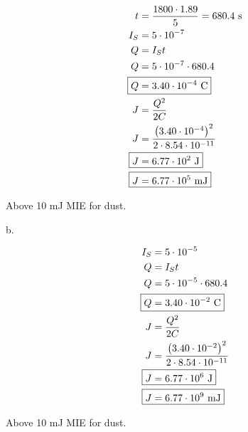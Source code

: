 \documentclass[12pt]{article}
\begin{document}
\begin{enumerate}
    \begin{align*}
        t &= \frac{1800 \cdot 1.89}{5} = 680.4 \text{ s} \\
        I_S &= 5 \cdot 10^{-7} \\
        Q &= I_S t \\
        Q &= 5 \cdot 10^{-7} \cdot 680.4 \\
        \Aboxed{Q &= 3.40\cdot10^{-4} \text{ C}} \\
        J &= \frac{Q^2}{2C} \\
        J &= \frac{\left(3.40\cdot10^{-4}\right)^2}{2\cdot8.54\cdot10^{-11}} \\
        \Aboxed{J &= 6.77\cdot10^{2} \text{ J}} \\
        \Aboxed{J &= 6.77\cdot10^{5} \text{ mJ}}
    \end{align*}

    Above 10 mJ MIE for dust.

    b.

    \begin{align*}
        I_S &= 5 \cdot 10^{-5} \\
        Q &= I_S t \\
        Q &= 5 \cdot 10^{-5} \cdot 680.4 \\
        \Aboxed{Q &= 3.40\cdot10^{-2} \text{ C}} \\
        J &= \frac{Q^2}{2C} \\
        J &= \frac{\left(3.40\cdot10^{-2}\right)^2}{2\cdot8.54\cdot10^{-11}} \\
        \Aboxed{J &= 6.77\cdot10^{6} \text{ J}} \\
        \Aboxed{J &= 6.77\cdot10^{9} \text{ mJ}}
    \end{align*}

    Above 10 mJ MIE for dust.
    
\end{enumerate}
\end{document}
